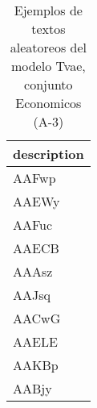 \begin{table}[H]
\centering
\fontsize{8}{14}\selectfont
\caption{Ejemplos de textos aleatoreos del modelo Tvae, conjunto Economicos (A-3)}
\label{table-sample10-economicos-a-3-tvae-text}
\begin{tabular}{|m{50em}|}
\hline
\rowcolor[gray]{0.8}
description \\
\hline AAFwp \\
\hline AAEWy \\
\hline AAFuc \\
\hline AAECB \\
\hline AAAsz \\
\hline AAJsq \\
\hline AACwG \\
\hline AAELE \\
\hline AAKBp \\
\hline AABjy \\
\hline
\end{tabular}
\end{table}
